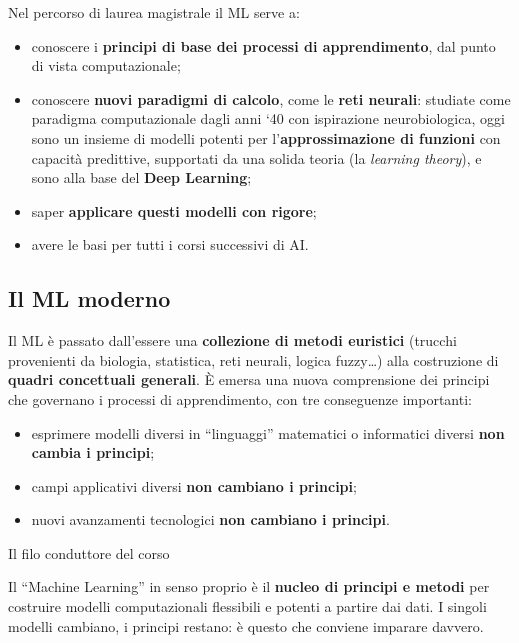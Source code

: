 Nel percorso di laurea magistrale il ML serve a:

\begin{itemize}
\tightlist
\item
  conoscere i \textbf{principi di base dei processi di apprendimento},
  dal punto di vista computazionale;
\item
  conoscere \textbf{nuovi paradigmi di calcolo}, come le \textbf{reti
  neurali}: studiate come paradigma computazionale dagli anni `40 con
  ispirazione neurobiologica, oggi sono un insieme di modelli potenti
  per l'\textbf{approssimazione di funzioni} con capacità predittive,
  supportati da una solida teoria (la \emph{learning theory}), e sono
  alla base del \textbf{Deep Learning};
\item
  saper \textbf{applicare questi modelli con rigore};
\item
  avere le basi per tutti i corsi successivi di AI.
\end{itemize}

\subsection{Il ML moderno}\label{il-ml-moderno}

Il ML è passato dall'essere una \textbf{collezione di metodi euristici}
(trucchi provenienti da biologia, statistica, reti neurali, logica
fuzzy\ldots) alla costruzione di \textbf{quadri concettuali generali}. È
emersa una nuova comprensione dei principi che governano i processi di
apprendimento, con tre conseguenze importanti:

\begin{itemize}
\tightlist
\item
  esprimere modelli diversi in ``linguaggi'' matematici o informatici
  diversi \textbf{non cambia i principi};
\item
  campi applicativi diversi \textbf{non cambiano i principi};
\item
  nuovi avanzamenti tecnologici \textbf{non cambiano i principi}.
\end{itemize}

\begin{boxtip}{Il filo conduttore del corso}

Il ``Machine Learning'' in senso proprio è il \textbf{nucleo di principi
e metodi} per costruire modelli computazionali flessibili e potenti a
partire dai dati. I singoli modelli cambiano, i principi restano: è
questo che conviene imparare davvero.

\end{boxtip}

